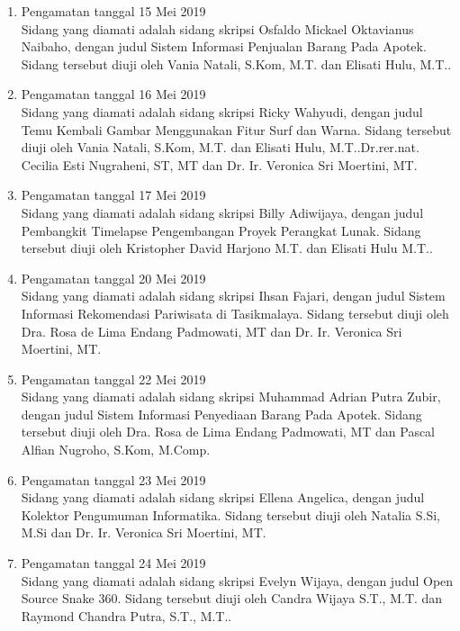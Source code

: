 \begin{enumerate}
	\item Pengamatan tanggal 15 Mei 2019 \\
	Sidang yang diamati adalah sidang skripsi Osfaldo Mickael Oktavianus Naibaho, dengan judul Sistem Informasi Penjualan Barang Pada Apotek. Sidang tersebut diuji oleh Vania Natali, S.Kom, M.T. dan Elisati Hulu, M.T..
	
	\item Pengamatan tanggal 16 Mei 2019 \\
	Sidang yang diamati adalah sidang skripsi Ricky Wahyudi, dengan judul Temu Kembali Gambar Menggunakan Fitur Surf dan Warna. Sidang tersebut diuji oleh Vania Natali, S.Kom, M.T. dan Elisati Hulu, M.T..Dr.rer.nat. Cecilia Esti Nugraheni, ST, MT dan Dr. Ir. Veronica Sri Moertini, MT.
	
	\item Pengamatan tanggal 17 Mei 2019 \\
	Sidang yang diamati adalah sidang skripsi Billy Adiwijaya, dengan judul Pembangkit Timelapse Pengembangan Proyek Perangkat Lunak. Sidang tersebut diuji oleh Kristopher David Harjono M.T. dan Elisati Hulu M.T..
	
	\item Pengamatan tanggal 20 Mei 2019 \\
	Sidang yang diamati adalah sidang skripsi Ihsan Fajari, dengan judul Sistem Informasi Rekomendasi Pariwisata di Tasikmalaya. Sidang tersebut diuji oleh Dra. Rosa de Lima Endang Padmowati, MT dan Dr. Ir. Veronica Sri Moertini, MT.
	
	\item Pengamatan tanggal 22 Mei 2019 \\
	Sidang yang diamati adalah sidang skripsi Muhammad Adrian Putra Zubir, dengan judul Sistem Informasi Penyediaan Barang Pada Apotek. Sidang tersebut diuji oleh Dra. Rosa de Lima Endang Padmowati, MT dan Pascal Alfian Nugroho, S.Kom, M.Comp.
	
	\item Pengamatan tanggal 23 Mei 2019 \\
	Sidang yang diamati adalah sidang skripsi Ellena Angelica, dengan judul Kolektor Pengumuman Informatika. Sidang tersebut diuji oleh Natalia S.Si, M.Si dan Dr. Ir. Veronica Sri Moertini, MT.
	
	\item Pengamatan tanggal 24 Mei 2019 \\
	Sidang yang diamati adalah sidang skripsi Evelyn Wijaya, dengan judul Open Source Snake 360. Sidang tersebut diuji oleh Candra Wijaya S.T., M.T. dan Raymond Chandra Putra, S.T., M.T..
	
\end{enumerate}

